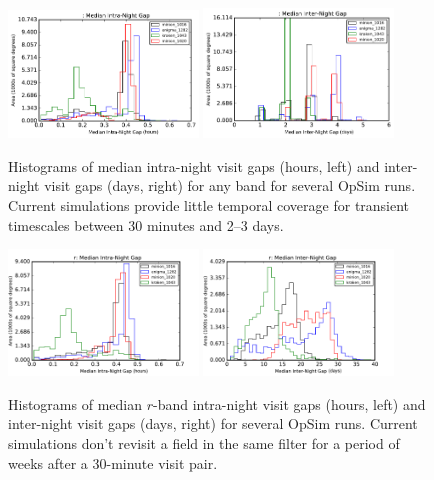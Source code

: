 \begin{figure}[hbt]
\centerline{
	\includegraphics[width=0.45\textwidth]{figs/transients/MedianIntra-NightGap.pdf}
	\includegraphics[width=0.45\textwidth]{figs/transients/MedianInter-NightGap.pdf}
}
\caption{ Histograms of median intra-night visit gaps (hours, left) and
	inter-night visit gaps (days, right)
for any band for several OpSim runs.  Current simulations provide little
	temporal coverage for transient timescales between 30 minutes and
	2--3 days.}
\label{fig:tgaps}
\end{figure}

\begin{figure}[hbt]
\centerline{
	\includegraphics[width=0.45\textwidth]{figs/transients/MedianIntra-NightGap_r.pdf}
	\includegraphics[width=0.45\textwidth]{figs/transients/MedianInter-NightGap_r.pdf}
}
\caption{ Histograms of median $r$-band intra-night visit gaps (hours,
	left) and inter-night visit gaps (days, right)
for several OpSim runs.  Current simulations don't revisit a field in the
	same filter for a period of weeks after a 30-minute visit pair.}
\label{fig:tgaps_r}
\end{figure}

